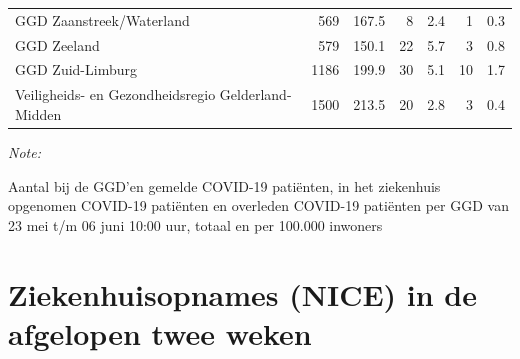 \documentclass[
  english,
  man,floatsintext]{apa6}
\begin{document}
\begin{table}
\begin{threeparttable}
\begin{tabular}{lrrrrrr}
GGD Zaanstreek/Waterland & 569 & 167.5 & 8 & 2.4 & 1 & 0.3\\
GGD Zeeland & 579 & 150.1 & 22 & 5.7 & 3 & 0.8\\
GGD Zuid-Limburg & 1186 & 199.9 & 30 & 5.1 & 10 & 1.7\\
Veiligheids- en Gezondheidsregio Gelderland-Midden & 1500 & 213.5 & 20 & 2.8 & 3 & 0.4\\
\bottomrule
\end{tabular}
\begin{tablenotes}
\item \textit{Note: } 
\item Aantal bij de GGD’en gemelde COVID-19 patiënten, in het ziekenhuis opgenomen COVID-19 patiënten en overleden COVID-19 patiënten per GGD van 23 mei t/m 06 juni 10:00 uur, totaal en per 100.000 inwoners
\end{tablenotes}
\end{threeparttable}
\endgroup{}
\end{table}

\newpage

\hypertarget{ziekenhuisopnames-nice-in-de-afgelopen-twee-weken}{%
\section{Ziekenhuisopnames (NICE) in de afgelopen twee weken}\label{ziekenhuisopnames-nice-in-de-afgelopen-twee-weken}}
\end{document}

